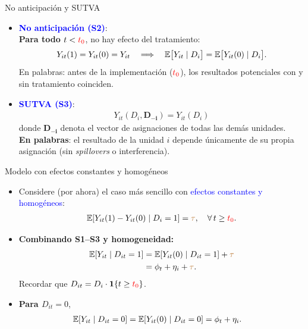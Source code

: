 \documentclass[10pt, xcolor=dvipsnames]{beamer}
\begin{document}
\begin{frame}{No anticipación y SUTVA}
\begin{itemize}\setlength{\itemsep}{1.0em}
    \item \textcolor{blue}{\textbf{No anticipación (S2)}}: \\
    \vspace{0.5em}
    \textbf{Para todo \(t<\textcolor{red}{t_0}\)}, no hay efecto del tratamiento:
    \begin{align*}
        Y_{it}(1)=Y_{it}(0) = Y_{it} \quad\Longrightarrow\quad \operatorname{\mathbb{E}}\!\big[Y_{it}\mid D_i\big]=\operatorname{\mathbb{E}}\!\big[Y_{it}(0)\mid D_i\big].
    \end{align*}
    En palabras: antes de la implementación (\(\textcolor{red}{t_0}\)), los resultados potenciales con y sin tratamiento coinciden.
    \item \textcolor{blue}{\textbf{SUTVA (S3)}}:
    \vspace{-1em}
    \begin{align*}
        Y_{it}(D_i, \mathbf{D_{-i}}) = Y_{it}(D_i)
    \end{align*}
    donde $\mathbf{D_{-i}}$ denota el vector de asignaciones de todas las demás unidades. \\
    \textbf{En palabras}: el resultado de la unidad \(i\) depende únicamente de su propia asignación (sin \textit{spillovers} o interferencia).
\end{itemize}	    
\end{frame}


\begin{frame}{Modelo con efectos constantes y homogéneos}
\begin{itemize}\setlength{\itemsep}{1.0em}
    \item Considere (por ahora) el caso más sencillo con \textcolor{blue}{efectos constantes y homogéneos}: 
    \vspace{-0.5em}
    \begin{align*}
        \operatorname{\mathbb{E}}[Y_{it}(1) -Y_{it}(0) \mid D_{i} = 1] = \textcolor{brown}{\tau}, \quad \forall \, t\geq\textcolor{red}{t_0}.   
    \end{align*}
    \item \textbf{Combinando S1–S3 y homogeneidad:}
    \begin{align*}
    \begin{split}
        \operatorname{\mathbb{E}}[Y_{it} \mid D_{it} = 1] &= \operatorname{\mathbb{E}}[Y_{it}(0) \mid D_{it} = 1] + \textcolor{brown}{\tau} \\ &= \phi_t + \eta_i + \textcolor{brown}{\tau}.
    \end{split}
    \end{align*}
    Recordar que \(D_{it} = D_i \cdot \mathbf{1}\{t \ge \textcolor{red}{t_0}\}\).
    \item \textbf{Para \(D_{it} = 0\)},
    \begin{align*}
    \begin{split}
        \operatorname{\mathbb{E}}[Y_{it} \mid D_{it} = 0] &= \operatorname{\mathbb{E}}[Y_{it}(0) \mid D_{it} = 0] = \phi_t + \eta_i.
    \end{split}
    \end{align*}
\end{itemize}	    
\end{frame}
\end{document}
